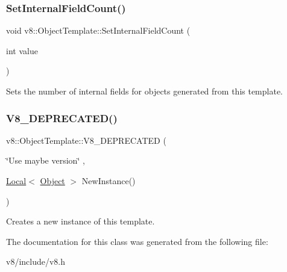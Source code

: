 \subsubsection{\texorpdfstring{Set\+Internal\+Field\+Count()}{SetInternalFieldCount()}}
{\footnotesize\ttfamily void v8\+::\+Object\+Template\+::\+Set\+Internal\+Field\+Count (\begin{DoxyParamCaption}\item[{int}]{value }\end{DoxyParamCaption})}

Sets the number of internal fields for objects generated from this template. \mbox{\label{classv8_1_1ObjectTemplate_ab13f4f7e5f31fc037f7a72cfbf89443d}} 
\subsubsection{\texorpdfstring{V8\+\_\+\+D\+E\+P\+R\+E\+C\+A\+T\+E\+D()}{V8\_DEPRECATED()}}
{\footnotesize\ttfamily v8\+::\+Object\+Template\+::\+V8\+\_\+\+D\+E\+P\+R\+E\+C\+A\+T\+ED (\begin{DoxyParamCaption}\item[{\char`\"{}Use maybe version\char`\"{}}]{,  }\item[{\mbox{\hyperlink{classv8_1_1Local}{Local}}$<$ \mbox{\hyperlink{classv8_1_1Object}{Object}} $>$ }]{New\+Instance() }\end{DoxyParamCaption})}

Creates a new instance of this template. 

The documentation for this class was generated from the following file\+:\begin{DoxyCompactItemize}
\item 
v8/include/v8.\+h\end{DoxyCompactItemize}
